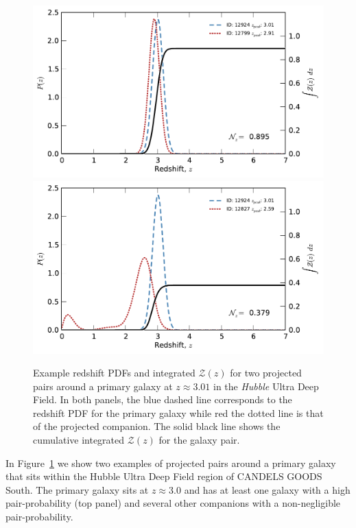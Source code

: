 \begin{figure}
\includegraphics[width=\columnwidth]{plots/PairsPz_pri_81_2.pdf}
\includegraphics[width=\columnwidth]{plots/PairsPz_pri_81_4.pdf}
  
  \caption[Example redshift PDFs and integrated $\mathcal{Z}(z)$ for two projected pairs around a primary galaxy at $z\approx 3.01$ in the \emph{Hubble} Ultra Deep Field.]{Example redshift PDFs and integrated $\mathcal{Z}(z)$ for two projected pairs around a primary galaxy at $z\approx 3.01$ in the \emph{Hubble} Ultra Deep Field. In both panels, the blue dashed line corresponds to the redshift PDF for the primary galaxy while red the dotted line is that of the projected companion. The solid black line shows the cumulative integrated $\mathcal{Z}(z)$ for the galaxy pair.}
  \label{merger-fig:pairs_pz}
\end{figure}

In Figure~\ref{merger-fig:pairs_pz} we show two examples of projected pairs around a primary galaxy that sits within the Hubble Ultra Deep Field region of CANDELS GOODS South. The primary galaxy sits at $z\approx 3.0$ and has at least one galaxy with a high pair-probability (top panel) and several other companions with a non-negligible pair-probability.

